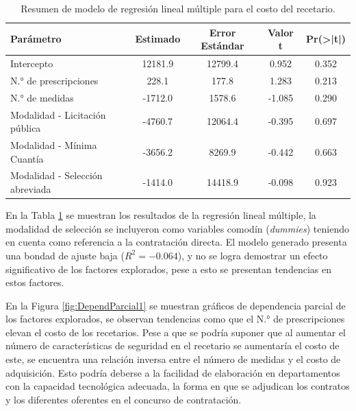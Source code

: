 \documentclass[
  oneside]{book}
\begin{document}
\begin{table}

\caption{\label{tab:resumenModeloRegresionLineal}Resumen de modelo de regresión lineal múltiple para el costo del recetario.}
\centering
\begin{tabular}[t]{lcccc}
\toprule
Parámetro & Estimado & Error Estándar & Valor t & Pr(>|t|)\\
\midrule
Intercepto & 12181.9 & 12799.4 & 0.952 & 0.352\\
N.° de prescripciones & 228.1 & 177.8 & 1.283 & 0.213\\
N.° de medidas & -1712.0 & 1578.6 & -1.085 & 0.290\\
Modalidad - Licitación pública & -4760.7 & 12064.4 & -0.395 & 0.697\\
Modalidad - Mínima Cuantía & -3656.2 & 8269.9 & -0.442 & 0.663\\
\addlinespace
Modalidad - Selección abreviada & -1414.0 & 14418.9 & -0.098 & 0.923\\
\bottomrule
\end{tabular}
\end{table}

En la Tabla \ref{tab:resumenModeloRegresionLineal} se muestran los resultados de la regresión lineal múltiple, la modalidad de selección se incluyeron como variables comodín (\emph{dummies}) teniendo en cuenta como referencia a la contratación directa. El modelo generado presenta una bondad de ajuste baja (\(R^{2} = -0.064\)), y no se logra demostrar un efecto significativo de los factores explorados, pese a esto se presentan tendencias en estos factores.

En la Figura \ref{fig:DependParcial1} se muestran gráficos de dependencia parcial de los factores explorados, se observan tendencias como que el N.° de prescripciones elevan el costo de los recetarios. Pese a que se podría suponer que al aumentar el número de características de seguridad en el recetario se aumentaría el costo de este, se encuentra una relación inversa entre el número de medidas y el costo de adquisición. Esto podría deberse a la facilidad de elaboración en departamentos con la capacidad tecnológica adecuada, la forma en que se adjudican los contratos y los diferentes oferentes en el concurso de contratación.
\end{document}
